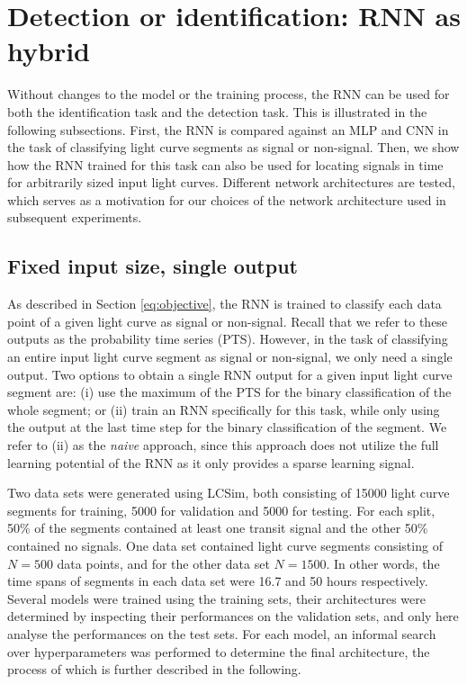 
\section{Detection or identification: RNN as hybrid}
\label{sec:exp_hybrid}

Without changes to the model or the training process, the RNN can be used for both the identification task and the detection task. This is illustrated in the following subsections. First, the RNN is compared against an MLP and CNN in the task of classifying light curve segments as signal or non-signal. Then, we show how the RNN trained for this task can also be used for locating signals in time for arbitrarily sized input light curves. Different network architectures are tested, which serves as a motivation for our choices of the network architecture used in subsequent experiments.

\subsection{Fixed input size, single output}
\label{sec:identification}

As described in Section \ref{eq:objective}, the RNN is trained to classify each data point of a given light curve as signal or non-signal. Recall that we refer to these outputs as the probability time series (PTS). However, in the task of classifying an entire input light curve segment as signal or non-signal, we only need a single output. Two options to obtain a single RNN output for a given input light curve segment are: (i) use the maximum of the PTS for the binary classification of the whole segment; or (ii) train an RNN specifically for this task, while only using the output at the last time step for the binary classification of the segment. We refer to (ii) as the \textit{naive} approach, since this approach does not utilize the full learning potential of the RNN as it only provides a sparse learning signal. 

Two data sets were generated using LCSim, both consisting of 15000 light curve segments for training, 5000 for validation and 5000 for testing. For each split, 50\% of the segments contained at least one transit signal and the other 50\% contained no signals. One data set contained light curve segments consisting of $N=500$ data points, and for the other data set $N = 1500$. In other words, the time spans of segments in each data set were 16.7 and 50 hours respectively. Several models were trained using the training sets, their architectures were determined by inspecting their performances on the validation sets, and only here analyse the performances on the test sets. For each model, an informal search over hyperparameters was performed to determine the final architecture, the process of which is further described in the following.

